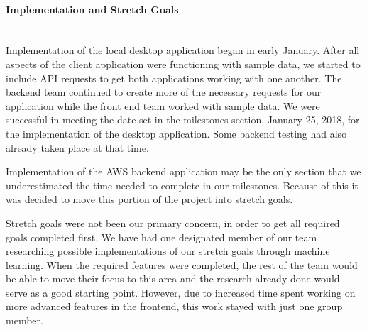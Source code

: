 \paragraph{Implementation and Stretch Goals} \mbox{}\\[\paragraphheaderspace]
Implementation of the local desktop application began in early January. After all aspects of the client application were functioning with sample data, we started to include API requests to get both applications working with one another. The backend team continued to create more of the necessary requests for our application while the front end team worked with sample data. We were successful in meeting the date set in the milestones section, January 25, 2018, for the implementation of the desktop application. Some backend testing had also already taken place at that time.\par
Implementation of the AWS backend application may be the only section that we underestimated the time needed to complete in our milestones. Because of this it was decided to move this portion of the project into stretch goals.\par
Stretch goals were not been our primary concern, in order to get all required goals completed first. We have had one designated member of our team researching possible implementations of our stretch goals through machine learning. When the required features were completed, the rest of the team would be able to move their focus to this area and the research already done would serve as a good starting point. However, due to increased time spent working on more advanced features in the frontend, this work stayed with just one group member.\par
